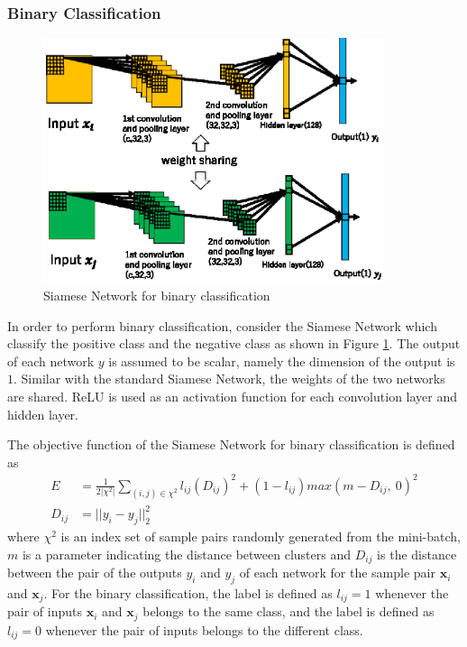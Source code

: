 \documentclass[a4paper,12pt]{article}
\begin{document}
\subsubsection{Binary Classification}
\begin{figure}[ht]
\begin{center}
\includegraphics[width=100mm]{figure2.eps}
\caption{Siamese Network for binary classification}
\label{fig:siamese-bi}
\end{center}
\end{figure}

In order to perform binary classification, consider the Siamese Network which classify the positive class and the negative class as shown in Figure \ref{fig:siamese-bi}.
The output of each network $y$ is assumed to be scalar, namely the dimension of the output is $1$.
Similar with the standard Siamese Network, the weights of the two networks are shared.
ReLU is used as an activation function for each convolution layer and hidden layer.


The objective function of the Siamese Network for binary classification is defined as
\begin{align}
E&=\frac{1}{2|\chi^2|}\sum_{(i,j) \in \chi^2} l_{ij}(D_{ij})^2 + (1-l_{ij})max(m-D_{ij}, ~0)^2 \\
D_{ij}&=||y_{i}- y_{j}||^2_2
\label{eq:siamese-dis}
\end{align}
where $\chi^2$ is an index set of sample pairs randomly generated from the mini-batch, $m$ is a parameter indicating the distance between clusters and 
$D_{ij}$ is the distance between the pair of the outputs $y_i$ and $y_j$ of each network for the sample pair $\bm{x}_i$ and $\bm{x}_j$.
For the binary classification, the label is defined as $l_{ij}=1$ whenever the pair of inputs ${\bm x_i}$ and ${\bm x_j}$ belongs to the same class, and the label is defined as $l_{ij}=0$ whenever the pair of inputs belongs to the different class.
\end{document}
